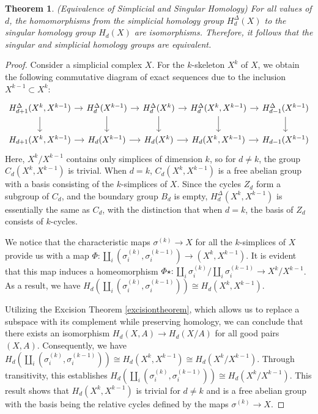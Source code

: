 \documentclass{amsart}
\newtheorem{theorem}[section]{Theorem}
\begin{document}
\begin{theorem}{(Equivalence of Simplicial and Singular Homology)}
For all values of $d$, the homomorphisms from the simplicial homology group $H^\Delta_d(X)$ to the singular homology group $H_d(X)$ are isomorphisms. Therefore, it follows that the singular and simplicial homology groups are equivalent.
\end{theorem}

\begin{proof}
Consider a simplicial complex $X$. For the $k$-skeleton $X^k$ of $X$, we obtain the following commutative diagram of exact sequences due to the inclusion $X^{k-1} \subset X^k$:
\begin{equation*}
\begin{tikzcd}[column sep=1em]
{H^\Delta_{d+1}(X^k,X^{k-1})} \arrow[d] \arrow[r] & H^\Delta_{d}(X^{k-1}) \arrow[d] \arrow[r] & H^\Delta_{d}(X^k) \arrow[d] \arrow[r] & {H^\Delta_{d}(X^k,X^{k-1})} \arrow[d] \arrow[r] & H^\Delta_{d-1}(X^{k-1}) \arrow[d] \\
{H_{d+1}(X^k,X^{k-1})} \arrow[r]                  & H_{d}(X^{k-1}) \arrow[r]                  & H_{d}(X^k) \arrow[r]                  & {H_{d}(X^k,X^{k-1})} \arrow[r]                  & H_{d-1}(X^{k-1})                 
\end{tikzcd}
\end{equation*}
Here, $X^k/X^{k-1}$ contains only simplices of dimension $k$, so for $d \neq k$, the group $C_d(X^k, X^{k-1})$ is trivial. When $d = k$, $C_d(X^k, X^{k-1})$ is a free abelian group with a basis consisting of the $k$-simplices of $X$. Since the cycles $Z_d$ form a subgroup of $C_d$, and the boundary group $B_d$ is empty, $H^\Delta_d(X^k, X^{k-1})$ is essentially the same as $C_d$, with the distinction that when $d = k$, the basis of $Z_d$ consists of $k$-cycles.

We notice that the characteristic maps $\sigma^{(k)} \rightarrow X$ for all the $k$-simplices of $X$ provide us with a map $\Phi: \coprod_i(\sigma^{(k)}_i, \sigma^{(k-1)}_i) \rightarrow (X^k, X^{k-1})$. It is evident that this map induces a homeomorphism $\Phi\star: \coprod_i \sigma^{(k)}_i/\coprod_i \sigma^{(k-1)}_i \rightarrow X^k/X^{k-1}$. As a result, we have $H_d(\coprod_i (\sigma^{(k)}_i, \sigma^{(k-1)}_i)) \cong H_d(X^k, X^{k-1})$.

Utilizing the Excision Theorem \ref{excisiontheorem}, which allows us to replace a subspace with its complement while preserving homology, we can conclude that there exists an isomorphism $H_d(X,A) \rightarrow H_d(X/A)$ for all good pairs $(X,A)$. Consequently, we have $H_d(\coprod_i (\sigma^{(k)}_i, \sigma^{(k-1)}_i)) \cong H_d(X^k, X^{k-1}) \cong H_d(X^k/X^{k-1})$. Through transitivity, this establishes $H_d(\coprod_i (\sigma^{(k)}_i, \sigma^{(k-1)}_i)) \cong H_d(X^k/X^{k-1})$. This result shows that $H_d(X^k, X^{k-1})$ is trivial for $d \neq k$ and is a free abelian group with the basis being the relative cycles defined by the maps $\sigma^{(k)} \rightarrow X$.


\end{proof}
\end{document}
